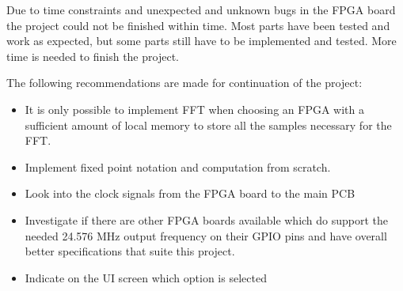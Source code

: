 Due to time constraints and unexpected and unknown bugs in the FPGA board the project could not be finished within time. Most parts have been tested and work as expected, but some parts still have to be implemented and tested. More time is needed to finish the project.

The following recommendations are made for continuation of the project:

\begin{itemize}
    \setlength\itemsep{-0.3em} %
    \item It is only possible to implement FFT when choosing an FPGA with a sufficient amount of local memory to store all the samples necessary for the FFT. 
    \item Implement fixed point notation and computation from scratch.
    \item Look into the clock signals from the FPGA board to the main PCB
    \item Investigate if there are other FPGA boards available which do support the needed 24.576 MHz output frequency on their GPIO pins and have overall better specifications that suite this project. 
    \item Indicate on the UI screen which option is selected
\end{itemize}